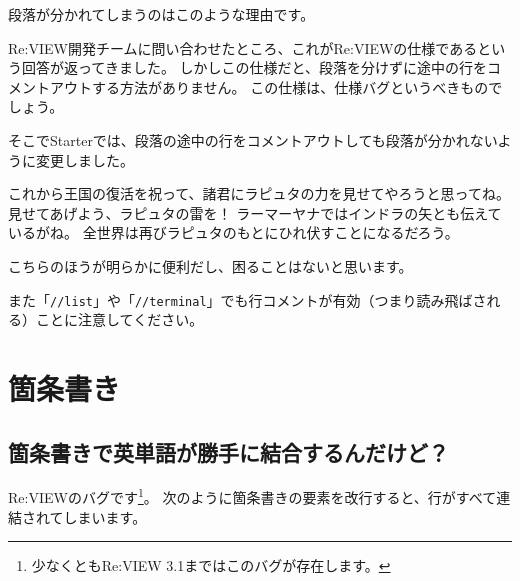 \begin{starterprogram}\end{starterprogram}

段落が分かれてしまうのはこのような理由です。

Re:VIEW開発チームに問い合わせたところ、これがRe:VIEWの仕様であるという回答が返ってきました。
しかしこの仕様だと、段落を分けずに途中の行をコメントアウトする方法がありません。
この仕様は、仕様バグというべきものでしょう。

そこでStarterでは、段落の途中の行をコメントアウトしても段落が分かれないように変更しました。

\noindent
{}

\starterresult

これから王国の復活を祝って、諸君にラピュタの力を見せてやろうと思ってね。
見せてあげよう、ラピュタの雷を！
ラーマーヤナではインドラの矢とも伝えているがね。
全世界は再びラピュタのもとにひれ伏すことになるだろう。

\endstarterresult

こちらのほうが明らかに便利だし、困ることはないと思います。

また「\texttt{//list}」や「\texttt{//terminal}」でも行コメントが有効（つまり読み飛ばされる）ことに注意してください。

\section{箇条書き}
\label{sec:2-2}

\subsection*{箇条書きで英単語が勝手に結合するんだけど？}
\label{sec:2-2-1}

Re:VIEWのバグです\footnote{少なくともRe:VIEW 3.1まではこのバグが存在します。}。
次のように箇条書きの要素を改行すると、行がすべて連結されてしまいます。

\begin{starterprogram}\end{starterprogram}
\noindent
{}

